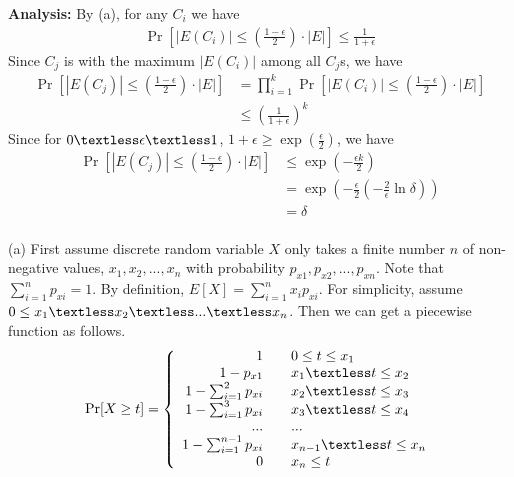 \textbf{Analysis:}
By (a), for any $C_i$ we have
\begin{align}
    \nonumber \Pr[|E(C_i)|\le (\frac{1-\epsilon}{2})\cdot |E|]\le \frac{1}{1+\epsilon}
\end{align}
Since $C_j$ is with the maximum $|E(C_i)|$ among all $C_j$s, we have
\begin{align}
    \nonumber \Pr[|E(C_j)|\le (\frac{1-\epsilon}{2})\cdot |E|]&=\prod_{i=1}^k \Pr[|E(C_i)|\le (\frac{1-\epsilon}{2})\cdot |E|]\\
    \nonumber &\le (\frac{1}{1+\epsilon})^k
\end{align}
Since for $0\textless \epsilon \textless 1$, $1+\epsilon \ge \exp({\frac{\epsilon}{2}})$, we have
\begin{align}
    \nonumber \Pr[|E(C_j)|\le (\frac{1-\epsilon}{2})\cdot |E|]&\le \exp({-\frac{\epsilon k}{2}})\\
    \nonumber&=\exp({-\frac{\epsilon}{2}(-\frac{2}{\epsilon}\ln \delta)})\\
    \nonumber&=\delta
\end{align}
\\
(a) 
First assume discrete random variable $X$ only takes a finite number $n$ of non-negative values, $x_1, x_2,...,x_n$ with probability $p_{x1},p_{x2},...,p_{xn}$. Note that $\sum_{i=1}^{n}p_{xi}=1$. 
By definition, $E[X]=\sum_{i=1}^{n}x_ip_{xi}$.
For simplicity, assume $0\le x_1\textless x_2 \textless ... \textless x_n$.
Then we can get a piecewise function as follows.
\begin{equation}
\nonumber \Pr[X\ge t]=\left\{
\begin{array}{rcl}
1 & & {0\le t \le x_1}\\
1-p_{x1} & & {x_1 \textless t \le x_2}\\
1-\sum_{i=1}^{2}p_{xi} & & {x_2 \textless t \le x_3}\\
1-\sum_{i=1}^{3}p_{xi} & & {x_3 \textless t \le x_4}\\
... & & ...\\
1-\sum_{i=1}^{n-1}p_{xi} & & {x_{n-1} \textless t \le x_n}\\
0 & & {x_n \le t}
\end{array} \right.
\end{equation}
